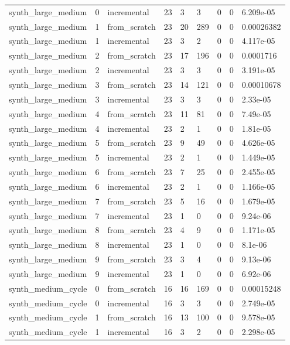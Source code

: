 \begin{table}[t]
\begin{tabular}{lllllllll}
synth\_large\_medium & 0 & incremental & 23 & 3 & 3 & 0 & 0 & 6.209e-05 \\
synth\_large\_medium & 1 & from\_scratch & 23 & 20 & 289 & 0 & 0 & 0.00026382 \\
synth\_large\_medium & 1 & incremental & 23 & 3 & 2 & 0 & 0 & 4.117e-05 \\
synth\_large\_medium & 2 & from\_scratch & 23 & 17 & 196 & 0 & 0 & 0.0001716 \\
synth\_large\_medium & 2 & incremental & 23 & 3 & 3 & 0 & 0 & 3.191e-05 \\
synth\_large\_medium & 3 & from\_scratch & 23 & 14 & 121 & 0 & 0 & 0.00010678 \\
synth\_large\_medium & 3 & incremental & 23 & 3 & 3 & 0 & 0 & 2.33e-05 \\
synth\_large\_medium & 4 & from\_scratch & 23 & 11 & 81 & 0 & 0 & 7.49e-05 \\
synth\_large\_medium & 4 & incremental & 23 & 2 & 1 & 0 & 0 & 1.81e-05 \\
synth\_large\_medium & 5 & from\_scratch & 23 & 9 & 49 & 0 & 0 & 4.626e-05 \\
synth\_large\_medium & 5 & incremental & 23 & 2 & 1 & 0 & 0 & 1.449e-05 \\
synth\_large\_medium & 6 & from\_scratch & 23 & 7 & 25 & 0 & 0 & 2.455e-05 \\
synth\_large\_medium & 6 & incremental & 23 & 2 & 1 & 0 & 0 & 1.166e-05 \\
synth\_large\_medium & 7 & from\_scratch & 23 & 5 & 16 & 0 & 0 & 1.679e-05 \\
synth\_large\_medium & 7 & incremental & 23 & 1 & 0 & 0 & 0 & 9.24e-06 \\
synth\_large\_medium & 8 & from\_scratch & 23 & 4 & 9 & 0 & 0 & 1.171e-05 \\
synth\_large\_medium & 8 & incremental & 23 & 1 & 0 & 0 & 0 & 8.1e-06 \\
synth\_large\_medium & 9 & from\_scratch & 23 & 3 & 4 & 0 & 0 & 9.13e-06 \\
synth\_large\_medium & 9 & incremental & 23 & 1 & 0 & 0 & 0 & 6.92e-06 \\
synth\_medium\_cycle & 0 & from\_scratch & 16 & 16 & 169 & 0 & 0 & 0.00015248 \\
synth\_medium\_cycle & 0 & incremental & 16 & 3 & 3 & 0 & 0 & 2.749e-05 \\
synth\_medium\_cycle & 1 & from\_scratch & 16 & 13 & 100 & 0 & 0 & 9.578e-05 \\
synth\_medium\_cycle & 1 & incremental & 16 & 3 & 2 & 0 & 0 & 2.298e-05 \\

\end{tabular}
\end{table}
